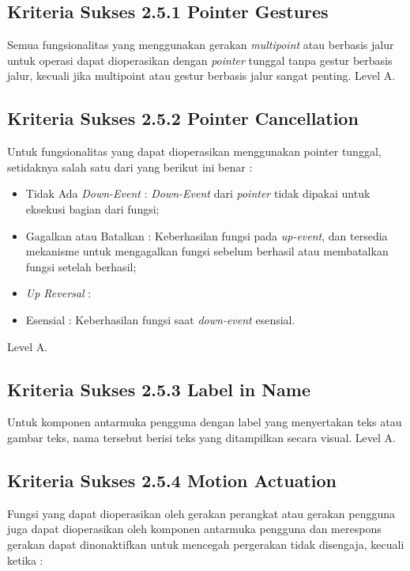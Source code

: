 \subsection{Kriteria Sukses 2.5.1 Pointer Gestures}
\label{sec:kriteria_2.5.1}
Semua fungsionalitas yang menggunakan gerakan \textit{multipoint} atau berbasis jalur untuk operasi dapat dioperasikan dengan \textit{pointer} tunggal tanpa gestur berbasis jalur, kecuali jika multipoint atau gestur berbasis jalur sangat penting.
Level A.

\subsection{Kriteria Sukses 2.5.2 Pointer Cancellation}
\label{sec:kriteria_2.5.2}
Untuk fungsionalitas yang dapat dioperasikan menggunakan pointer tunggal, setidaknya salah satu dari yang berikut ini benar :

\begin{itemize}
	\item Tidak Ada \textit{Down-Event} : \textit{Down-Event} dari \textit{pointer} tidak dipakai untuk eksekusi bagian dari fungsi;
	\item Gagalkan atau Batalkan : Keberhasilan fungsi pada \textit{up-event}, dan tersedia mekanisme untuk mengagalkan fungsi sebelum berhasil atau membatalkan fungsi setelah berhasil;
	\item \textit{Up Reversal} : 
	\item Esensial : Keberhasilan fungsi saat \textit{down-event} esensial.
\end{itemize}

Level A.

\subsection{Kriteria Sukses 2.5.3 Label in Name}
\label{sec:kriteria_2.5.3}
Untuk komponen antarmuka pengguna dengan label yang menyertakan teks atau gambar teks, nama tersebut berisi teks yang ditampilkan secara visual.
Level A.

\subsection{Kriteria Sukses 2.5.4 Motion Actuation}
\label{sec:kriteria_2.5.4}
Fungsi yang dapat dioperasikan oleh gerakan perangkat atau gerakan pengguna juga dapat dioperasikan oleh komponen antarmuka pengguna dan merespons gerakan dapat dinonaktifkan untuk mencegah pergerakan tidak disengaja, kecuali ketika :

